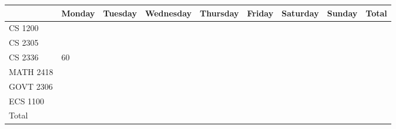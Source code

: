 \documentclass [11pt] {article}
\begin{document}
\begin {center}

    \begin {tabular} {|l|l|l|l|l|l|l|l|l|}

        \hline
        &   Monday  & Tuesday   & Wednesday     & Thursday  & Friday    & Saturday  & Sunday    & Total \\ 
        \hline
        CS 1200     &   &   &   &   &   &   & \\
        \hline
        CS 2305     &   &   &   &   &   &   & \\
        \hline
        CS 2336     & 60  &   &   &   &   &   & \\
        \hline
        MATH 2418   &   &   &   &   &   &   & \\
        \hline
        GOVT 2306   &   &   &   &   &   &   & \\
        \hline
        ECS 1100    &   &   &   &   &   &   & \\
        \hline
        Total       &   &   &   &   &   &   & \\
        \hline

    \end {tabular}	

\end {center}
\end{document}
